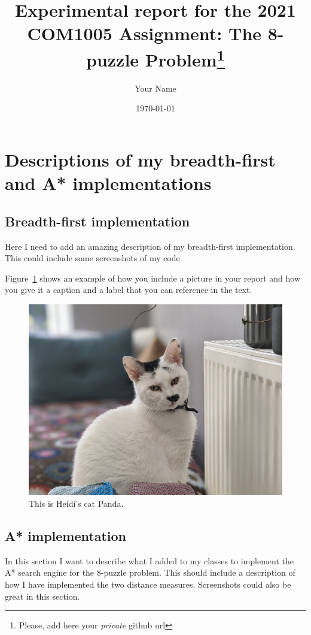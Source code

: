 \documentclass[11pt,oneside]{article}
\title{Experimental report for the 2021 COM1005 Assignment: The 8-puzzle Problem\footnote{Please, add here your \textsl{private} github url}}
\author{Your Name}
\date{\today}
\begin{document}
\maketitle

\section{Descriptions of my breadth-first and A* implementations}

\subsection{Breadth-first implementation}

Here I need to add an amazing description of my breadth-first implementation. This could include some screenshots of my code.

Figure~\ref{fig:panda} shows an example of how you include a picture in your report and how you give it a caption and a label that you can reference in the text.

\begin{figure}[ht]
\centering
  \includegraphics[scale=0.4]{Panda.png}
  \caption{This is Heidi's cat Panda.}
  \label{fig:panda}
 \end{figure} 

\subsection{A* implementation}

In this section I want to describe what I added to my classes to implement the A* search engine for the 8-puzzle problem. This should include a description of how I have implemented the two distance measures. Screenshots could also be great in this section.
\end{document}
